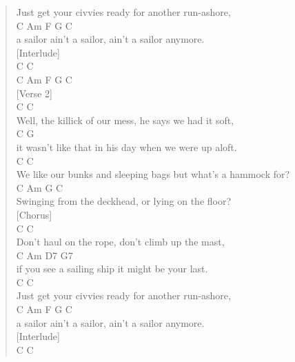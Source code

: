 \documentclass[11pt]{article}
\begin{document}
\begin{verse}
Just get your civvies ready for another run-ashore,\\
\hspace*{2em}C              Am              F      G  C\\
a sailor ain't a sailor, ain't a sailor anymore.\\
\vspace*{1em}
[Interlude]\\
C         C\\
C    Am   F G  C\\
\vspace*{1em}
[Verse 2]\\
\hspace*{10em}C                       C\\
Well, the killick of our mess, he says we had it soft,\\
\hspace*{3em}C                                G\\
it wasn't like that in his day when we were up aloft.\\
\hspace*{3em}C                                    C\\
We like our bunks and sleeping bags but what's a hammock for?\\
C                              Am G          C\\
Swinging from the deckhead, or lying on the floor?\\
\vspace*{1em}
[Chorus]\\
\hspace*{6em}C                       C\\
Don't haul on the rope, don't climb up the mast,\\
C            Am              D7            G7\\
if you see a sailing ship it might be your last.\\
\hspace*{5em}C                           C\\
Just get your civvies ready for another run-ashore,\\
\hspace*{2em}C              Am              F      G  C\\
a sailor ain't a sailor, ain't a sailor anymore.\\
\vspace*{1em}
[Interlude]\\
C         C\\

\end{verse}
\end{document}
